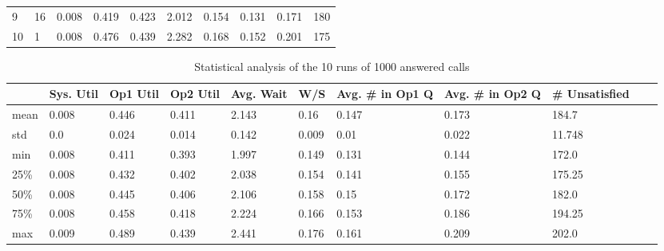 \documentclass{article}
\begin{document}
\begin{table}[H]
\begin{tabular}{@{}llllllllll@{}}
        9            & 16            & 0.008              & 0.419             & 0.423             & 2.012              & 0.154        & 0.131                     & 0.171                     & 180                     \\
        10           & 1             & 0.008              & 0.476             & 0.439             & 2.282              & 0.168        & 0.152                     & 0.201                     & 175                     \\ \bottomrule
    \end{tabular}
\end{table}

\begin{table}[H]
    \tiny
    \centering
    \caption{Statistical analysis of the 10 runs of 1000 answered calls}
    \begin{tabular}{@{}lllllllllll@{}}
        \toprule
        \textbf{} & \textbf{Sys. Util} & \textbf{Op1 Util} & \textbf{Op2 Util} & \textbf{Avg. Wait} & \textbf{W/S} & \textbf{Avg. \# in Op1 Q} & \textbf{Avg. \# in Op2 Q} & \textbf{\# Unsatisfied} \\ \midrule
        mean      & 0.008              & 0.446             & 0.411             & 2.143              & 0.16         & 0.147                     & 0.173                     & 184.7                   \\
        std       & 0.0                & 0.024             & 0.014             & 0.142              & 0.009        & 0.01                      & 0.022                     & 11.748                  \\
        min       & 0.008              & 0.411             & 0.393             & 1.997              & 0.149        & 0.131                     & 0.144                     & 172.0                   \\
        25\%      & 0.008              & 0.432             & 0.402             & 2.038              & 0.154        & 0.141                     & 0.155                     & 175.25                  \\
        50\%      & 0.008              & 0.445             & 0.406             & 2.106              & 0.158        & 0.15                      & 0.172                     & 182.0                   \\
        75\%      & 0.008              & 0.458             & 0.418             & 2.224              & 0.166        & 0.153                     & 0.186                     & 194.25                  \\
        max       & 0.009              & 0.489             & 0.439             & 2.441              & 0.176        & 0.161                     & 0.209                     & 202.0                   \\ \bottomrule
    \end{tabular}
\end{table}
\end{document}
